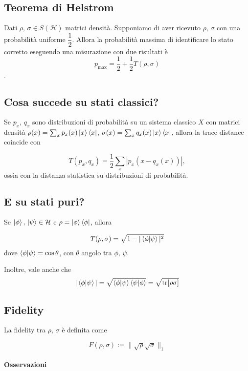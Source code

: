 \documentclass{report}
\begin{document}
\subsection{Teorema di Helstrom}

Dati $\rho,\, \sigma \in S(\mathcal H)$ matrici densità. Supponiamo di aver ricevuto $\rho, \, \sigma$ con una probabilità uniforme $\dfrac{1}{2}$. Allora la probabilità massima di identificare lo stato corretto eseguendo una misurazione con due risultati è \begin{equation}
p_{\max} = \frac{1}{2} + \frac{1}{2}T(\rho, \sigma)
\end{equation}.

\subsection{Cosa succede su stati classici?}
Se $p_x, \, q_x$ sono distribuzioni di probabilità su un sistema classico $X$ con matrici densità $\rho(x) = \sum_x p_x(x) \ket x \bra x$, $\sigma(x) = \sum_x q_x(x) \ket x \bra x$, allora la trace distance coincide con 

\begin{equation}
T(p_x, q_x) = \frac{1}{2} \sum_x |p_x(x - q_x(x))|,
\end{equation}
%
ossia con la distanza statistica su distribuzioni di probabilità.

\subsection{E su stati puri?}
Se $\ket\phi, \, \ket\psi \in \mathcal H$ e $\rho = \ket\phi \bra\phi$, allora

\begin{equation}
T(\rho, \sigma) = \sqrt{1 - |\braket{\phi\lvert\psi}|^2} 
\end{equation}
%
dove $\braket{\phi \lvert \psi} = \cos\theta$, con $\theta$ angolo tra $\phi, \, \psi$.

Inoltre, vale anche che 
\begin{equation}
|\braket{\phi \lvert \psi} | = \sqrt{\braket{\phi \lvert \psi}\braket{\psi \lvert \phi}} = \sqrt{\mathrm{tr}[\rho\sigma]}
\end{equation}

\subsection{Fidelity}
La fidelity tra $\rho, \, \sigma$ è definita come

\begin{equation}
F(\rho, \sigma) := \|\sqrt\rho\sqrt\sigma \|_1
\end{equation}

\paragraph{Osservazioni}
\end{document}
